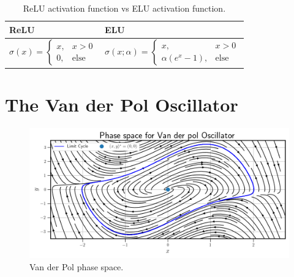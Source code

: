 \begin{table}[!htb]
    \centering
    \begin{minipage}{\textwidth}
        \caption{ReLU activation function vs ELU activation function.}
        \label{table:elu vs relu}
        \begin{tabularx}{\textwidth}{|>{\centering\arraybackslash}X|>{\centering\arraybackslash}X|} \hline%
            ReLU & ELU \\ \hline \hline
            $\sigma(x) = \begin{cases}
                x, & x > 0 \\
                0, & \text{else}
            \end{cases}$ & 
            $\sigma(x; \alpha) = \begin{cases}
                x, & x > 0 \\
                \alpha(e^x - 1), & \text{else}
            \end{cases}$ \\ \hline
        \end{tabularx}
    \end{minipage}
\end{table}

\section{The Van der Pol Oscillator}
\label{section:van der pol results}

\begin{figure}[ht]
    \centering
    \begin{minipage}{\textwidth}
        \includegraphics[width=\textwidth]{"Figures/van_der_pol_phase_space.png"} 
    \end{minipage}
    \caption{Van der Pol phase space.}
    \label{fig:van der pol phase space}
\end{figure}

